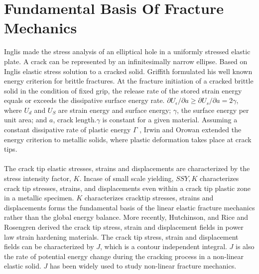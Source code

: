 \documentclass[11pt]{article}
\begin{document}
\section{Fundamental Basis Of Fracture Mechanics}
Inglis made the stress analysis of an elliptical hole in a uniformly stressed elastic plate. A crack can be 
represented by an infinitesimally narrow ellipse. Based on Inglis elastic stress solution to a cracked solid. 
Griffith formulated his well known energy criterion for brittle fractures. At the fracture initiation of a cracked brittle solid in the 
condition of fixed grip, the release rate of the stored strain energy equals or exceeds the dissipative surface energy rate.
\(\partial U_\epsilon / \partial a \geq \partial U_s / \partial a = 2 \gamma \), 
where $U_d$ and $U_S$ are strain energy and surface energy; $\gamma$,  the surface energy per unit area; and $a$, crack length.$\gamma$ 
is constant for a given material. Assuming a constant dissipative rate of plastic energy $\Gamma $ , 
Irwin and Orowan extended the energy criterion to metallic solids, where plastic deformation takes place at crack tips.
\\\\The crack tip elastic stresses, strains and displacements are characterized by the stress intensity factor, $K$.  
Incase of small scale yielding, $SSY, K$ characterizes crack tip stresses, strains, and displacements even within a 
crack tip plastic zone in a metallic specimen. $K$ characterizes cracktip
stresses, strains and displacements forms the fundamental basis of the linear elastic fracture mechanics rather than 
the global energy balance. More recently, Hutchinson, and Rice and Rosengren derived the crack tip stress, strain and 
displacement fields in power law strain hardening 
materials. The crack tip stress, strain and displacement 
fields can be characterized by $J$, which is a contour independent 
integral. $J$ is also the rate of potential energy change during 
the cracking process in a non-linear elastic solid. $J$ has been 
widely used to study non-linear fracture mechanics.
\end{document}
